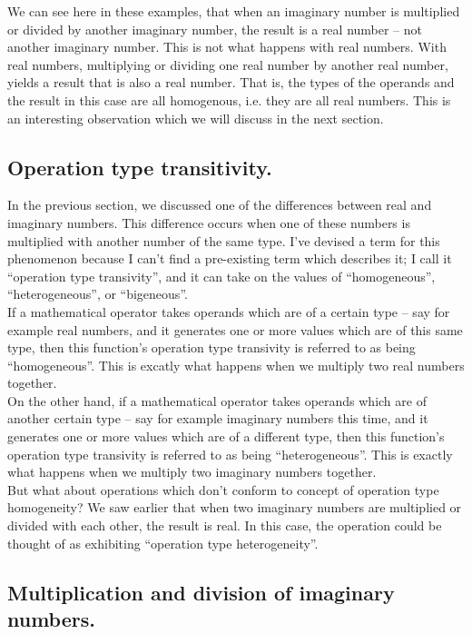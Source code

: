 \documentclass{article}
\begin{document}
We can see here in these examples, that when an imaginary number is multiplied or divided by another imaginary
number, the result is a real number -- not another imaginary number. This is not what happens with real numbers.
With real numbers, multiplying or dividing one real number by another real number, yields a result that is
also a real number. That is, the types of the operands and the result in this case are all homogenous, i.e. 
they are all real numbers. This is an interesting observation which we will discuss in the next section. 

\subsection{Operation type transitivity.}

In the previous section, we discussed one of the differences between real and imaginary numbers. This difference
occurs when one of these numbers is multiplied with another number of the same type. I've devised a term for this
phenomenon because I can't find a pre-existing term which describes it; I call it ``operation type transivity'', and
it can take on the values of ``homogeneous'', ``heterogeneous'', or ``bigeneous''.\\

If a mathematical operator takes operands which are of a certain type -- say for example real numbers, and it
generates one or more values which are of this same type, then this function's operation type transivity is
referred to as being ``homogeneous''. This is excatly what happens when we multiply two real numbers together.\\

On the other hand, if a mathematical operator takes operands which are of another certain type -- say for example 
imaginary numbers this time, and it generates one or more values which are of a different type, then this function's 
operation type transivity is referred to as being ``heterogeneous''. This is exactly what happens when we multiply two
imaginary numbers together.\\

But what about operations which don't conform to concept of operation type homogeneity? We saw earlier that when 
two imaginary numbers are multiplied or divided with each other, the result is real. In this case, the operation
could be thought of as exhibiting ``operation type heterogeneity''.


\subsection{Multiplication and division of imaginary numbers.}
\end{document}
